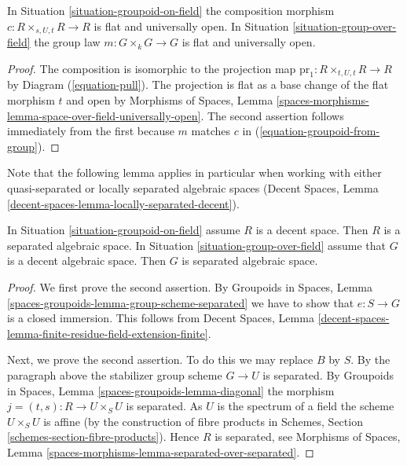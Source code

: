 \begin{lemma}
\label{lemma-groupoid-on-field-open-multiplication}
In
Situation \ref{situation-groupoid-on-field}
the composition morphism $c : R \times_{s, U, t} R \to R$ is flat and
universally open.
In
Situation \ref{situation-group-over-field}
the group law $m : G \times_k G \to G$ is flat and
universally open.
\end{lemma}

\begin{proof}
The composition is isomorphic to the projection map
$\text{pr}_1 : R \times_{t, U, t} R \to R$ by
Diagram (\ref{equation-pull}).
The projection is flat as a base change of the flat morphism $t$
and open by
Morphisms of Spaces,
Lemma \ref{spaces-morphisms-lemma-space-over-field-universally-open}.
The second assertion follows immediately from the first because
$m$ matches $c$ in (\ref{equation-groupoid-from-group}).
\end{proof}

\noindent
Note that the following lemma applies in particular when working
with either quasi-separated or locally separated algebraic spaces
(Decent Spaces, Lemma \ref{decent-spaces-lemma-locally-separated-decent}).

\begin{lemma}
\label{lemma-group-scheme-over-field-separated}
In Situation \ref{situation-groupoid-on-field}
assume $R$ is a decent space. Then $R$ is a separated algebraic space.
In Situation \ref{situation-group-over-field} assume that
$G$ is a decent algebraic space. Then $G$ is separated algebraic space.
\end{lemma}

\begin{proof}
We first prove the second assertion. By Groupoids in Spaces,
Lemma \ref{spaces-groupoids-lemma-group-scheme-separated}
we have to show that $e : S \to G$ is a closed immersion.
This follows from Decent Spaces, Lemma
\ref{decent-spaces-lemma-finite-residue-field-extension-finite}.

\medskip\noindent
Next, we prove the second assertion. To do this we may replace $B$ by $S$.
By the paragraph above the stabilizer group scheme $G \to U$ is separated. By
Groupoids in Spaces, Lemma \ref{spaces-groupoids-lemma-diagonal}
the morphism $j = (t, s) : R \to U \times_S U$ is separated.
As $U$ is the spectrum of a field the scheme
$U \times_S U$ is affine (by the construction of fibre products in
Schemes, Section \ref{schemes-section-fibre-products}).
Hence $R$ is separated, see
Morphisms of Spaces, Lemma
\ref{spaces-morphisms-lemma-separated-over-separated}.
\end{proof}

